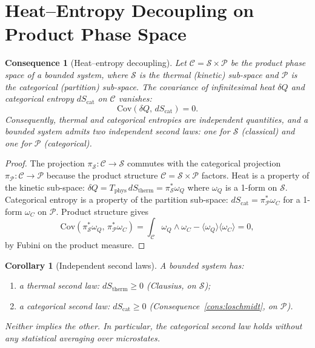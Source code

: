 \documentclass[11pt,twocolumn,a4paper]{article}
\theoremstyle{axiomstyle}
\theoremstyle{conseqstyle}
\newtheorem{consequence}{Consequence}
\newtheorem{corollary}{Corollary}
\theoremstyle{definition}
\theoremstyle{remark}
\begin{document}
\section{Heat--Entropy Decoupling on Product Phase Space}
\label{sec:heatentropy}

\begin{consequence}[Heat--entropy decoupling]\label{cons:heatentropy}
Let $\mathcal{C}=\mathcal{S}\times\mathcal{P}$ be the product phase space of a bounded system, where $\mathcal{S}$ is the thermal (kinetic) sub-space and $\mathcal{P}$ is the categorical (partition) sub-space. The covariance of infinitesimal heat $\delta Q$ and categorical entropy $dS_{\mathrm{cat}}$ on $\mathcal{C}$ vanishes:
\begin{equation}
\mathrm{Cov}(\delta Q,\,dS_{\mathrm{cat}})=0.
\end{equation}
Consequently, thermal and categorical entropies are independent quantities, and a bounded system admits \emph{two} independent second laws: one for $\mathcal{S}$ (classical) and one for $\mathcal{P}$ (categorical).
\end{consequence}

\begin{proof}
The projection $\pi_{\mathcal{S}}:\mathcal{C}\to\mathcal{S}$ commutes with the categorical projection $\pi_{\mathcal{P}}:\mathcal{C}\to\mathcal{P}$ because the product structure $\mathcal{C}=\mathcal{S}\times\mathcal{P}$ factors. Heat is a property of the kinetic sub-space: $\delta Q=T_{\mathrm{phys}}\,dS_{\mathrm{therm}}=\pi_{\mathcal{S}}^{*}\omega_{Q}$ where $\omega_{Q}$ is a 1-form on $\mathcal{S}$. Categorical entropy is a property of the partition sub-space: $dS_{\mathrm{cat}}=\pi_{\mathcal{P}}^{*}\omega_{C}$ for a 1-form $\omega_{C}$ on $\mathcal{P}$. Product structure gives
\begin{equation*}
\mathrm{Cov}(\pi_{\mathcal{S}}^{*}\omega_{Q},\,\pi_{\mathcal{P}}^{*}\omega_{C})=\int_{\mathcal{C}}\omega_{Q}\wedge\omega_{C}-\langle\omega_{Q}\rangle\langle\omega_{C}\rangle=0,
\end{equation*}
by Fubini on the product measure.
\end{proof}

\begin{corollary}[Independent second laws]\label{cor:twosecondlaws}
A bounded system has:
\begin{enumerate}[nosep,label=(\roman*)]
\item a thermal second law: $dS_{\mathrm{therm}}\geq 0$ (Clausius, on $\mathcal{S}$);
\item a categorical second law: $dS_{\mathrm{cat}}\geq 0$ (Consequence~\ref{cons:loschmidt}, on $\mathcal{P}$).
\end{enumerate}
Neither implies the other. In particular, the categorical second law holds without any statistical averaging over microstates.
\end{corollary}
\end{document}
